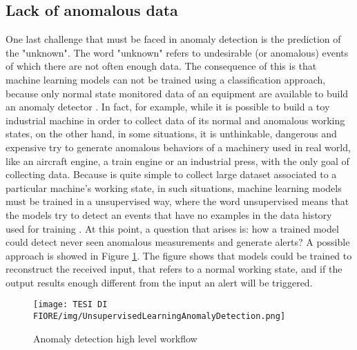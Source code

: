 \subsection{Lack of anomalous data}
One last challenge that must be faced in anomaly detection is the prediction of the "unknown". The word "unknown" refers to undesirable (or anomalous) events of which there are not often enough data. The consequence of this is that machine learning models can not be trained using a classification approach, because only normal state monitored data of an equipment are available to build an anomaly detector \cite{7AnomalyDetectionUnsupervised}. In fact, for example, while it is possible to build a toy industrial machine in order to collect data of its normal and anomalous working states, on the other hand, in some situations, it is unthinkable, dangerous and expensive try to generate anomalous behaviors of a machinery used in real world, like an aircraft engine, a train engine or an industrial press, with the only goal of collecting data. Because is quite simple to collect large dataset associated to a particular machine's working state, in such situations, machine learning models must be trained in a unsupervised way, where the word unsupervised means that the models try to detect an events that have no examples in the data history used for training \cite{8AnomalyDetectionUnsupervised2}. At this point, a question that arises is: how a trained model could detect never seen anomalous measurements and generate alerts? A possible approach is showed in Figure \ref{scoring_system_approach}. The figure shows that models could be trained to reconstruct the received input, that refers to a normal working state, and if the output results enough different from the input an alert will be triggered.

\begin{figure}[ht]
\texttt{[image: TESI DI FIORE/img/UnsupervisedLearningAnomalyDetection.png]}
\centering
\caption{Anomaly detection high level workflow \cite{7AnomalyDetectionUnsupervised}}
\label{scoring_system_approach}
\end{figure}

